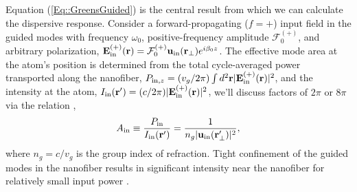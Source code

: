 \documentclass[preprint,aps,pra,onecolumn]{revtex4-1} %
\newcommand{\inp}{{\rm in}}
\newcommand{\fwd}{+}
\newcommand{\Eamp}{\mathcal{F}_0^{(+)}}
\newcommand{\comment}[1]{{\color{Maroon} #1}}
\begin{document}
Equation (\ref{Eq::GreensGuided}) is the central result from which we can calculate the dispersive response.  Consider a forward-propagating ($f=+$) input field in the guided modes with frequency $\omega_0$, positive-frequency amplitude $\Eamp$, and arbitrary polarization, $\mathbf{E}^{(+)}_{\inp}(\br) = \Eamp  \mathbf{u}_{\rm in}(\br_\perp) e^{i \beta_0 z}$. 
The effective mode area at the atom's position is determined from the total cycle-averaged power transported along the nanofiber, $P_{{\rm in},z} = (v_g/2\pi) \int d^2\br |\mathbf{E}^{(+)}_{\inp}(\br) |^2$, and the intensity at the atom, $I_{\rm in}(\mathbf{r}') = (c/2\pi) |\mathbf{E}^{(+)}_{\inp}(\br) |^2$,\comment{we'll discuss factors of $2\pi$ or $ 8\pi $} via the relation \cite{domokos_quantum_2002},
 	\begin{align} \label{Eq::AreaIn}
 		A_{\rm in} \equiv \frac{P_{{\rm in}}}{I_{\rm in}(\mathbf{r}')} = \frac{1}{n_g |\mathbf{u}_{\rm in}(\mathbf{r}'_\perp)|^{2}},
	\end{align}
where $n_g = c/v_g$ is the group index of refraction.  Tight confinement of the guided modes in the nanofiber results in significant intensity near the nanofiber for relatively small input power \cite{bures_power_1999}.  
\end{document}
